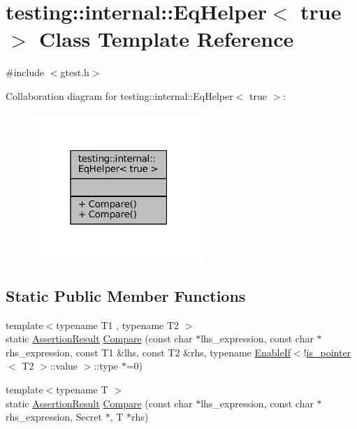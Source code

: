 \hypertarget{classtesting_1_1internal_1_1EqHelper_3_01true_01_4}{}\section{testing\+:\+:internal\+:\+:Eq\+Helper$<$ true $>$ Class Template Reference}
\label{classtesting_1_1internal_1_1EqHelper_3_01true_01_4}


{\ttfamily \#include $<$gtest.\+h$>$}



Collaboration diagram for testing\+:\+:internal\+:\+:Eq\+Helper$<$ true $>$\+:
\nopagebreak
\begin{figure}[H]
\begin{center}
\leavevmode
\includegraphics[width=183pt]{classtesting_1_1internal_1_1EqHelper_3_01true_01_4__coll__graph}
\end{center}
\end{figure}
\subsection*{Static Public Member Functions}
\begin{DoxyCompactItemize}
\item 
{\footnotesize template$<$typename T1 , typename T2 $>$ }\\static \hyperlink{classtesting_1_1AssertionResult}{Assertion\+Result} \hyperlink{classtesting_1_1internal_1_1EqHelper_3_01true_01_4_a12c7194b2a210b61f06c912eef484ca6}{Compare} (const char $\ast$lhs\+\_\+expression, const char $\ast$rhs\+\_\+expression, const T1 \&lhs, const T2 \&rhs, typename \hyperlink{structtesting_1_1internal_1_1EnableIf}{Enable\+If}$<$!\hyperlink{structtesting_1_1internal_1_1is__pointer}{is\+\_\+pointer}$<$ T2 $>$\+::value $>$\+::type $\ast$=0)
\item 
{\footnotesize template$<$typename T $>$ }\\static \hyperlink{classtesting_1_1AssertionResult}{Assertion\+Result} \hyperlink{classtesting_1_1internal_1_1EqHelper_3_01true_01_4_a6f292601a68c8f0d49e6d48bd309b900}{Compare} (const char $\ast$lhs\+\_\+expression, const char $\ast$rhs\+\_\+expression, Secret $\ast$, T $\ast$rhs)
\end{DoxyCompactItemize}


